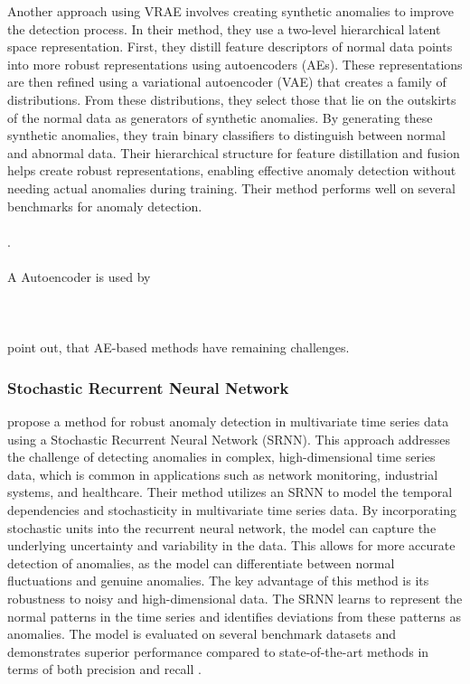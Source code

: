Another approach using VRAE involves creating synthetic anomalies to improve the detection process. In their method, they use a two-level hierarchical latent space representation. First, they distill feature descriptors of normal data points into more robust representations using autoencoders (AEs). These representations are then refined using a variational autoencoder (VAE) that creates a family of distributions. From these distributions, they select those that lie on the outskirts of the normal data as generators of synthetic anomalies.
By generating these synthetic anomalies, they train binary classifiers to distinguish between normal and abnormal data. Their hierarchical structure for feature distillation and fusion helps create robust representations, enabling effective anomaly detection without needing actual anomalies during training. Their method performs well on several benchmarks for anomaly detection.\\\\
 \cite{ramirez_rivera_anomaly_2022}. \\\\
A Autoencoder is used by \cite{pranavan_contrastive_2022} \\\\%
\cite{yue_ts2vec_2022}\\\\%
 point out, that AE-based methods have remaining challenges.
\subsubsection{Stochastic Recurrent Neural Network}
 propose a method for robust anomaly detection in multivariate time series data using a Stochastic Recurrent Neural Network (SRNN). This approach addresses the challenge of detecting anomalies in complex, high-dimensional time series data, which is common in applications such as network monitoring, industrial systems, and healthcare.
Their method utilizes an SRNN to model the temporal dependencies and stochasticity in multivariate time series data. By incorporating stochastic units into the recurrent neural network, the model can capture the underlying uncertainty and variability in the data. This allows for more accurate detection of anomalies, as the model can differentiate between normal fluctuations and genuine anomalies.
The key advantage of this method is its robustness to noisy and high-dimensional data. The SRNN learns to represent the normal patterns in the time series and identifies deviations from these patterns as anomalies. The model is evaluated on several benchmark datasets and demonstrates superior performance compared to state-of-the-art methods in terms of both precision and recall \cite{su_robust_2019}.
